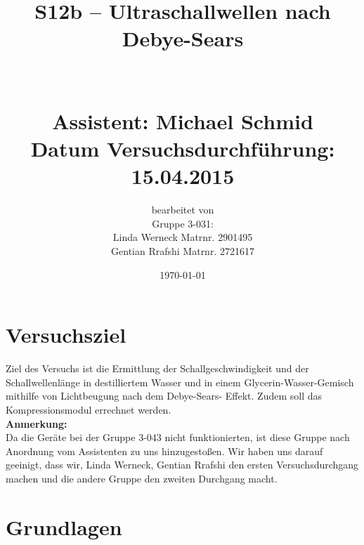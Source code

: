 \documentclass[fontsize=12pt]{scrartcl}
\begin{document}
\begin{minipage}{\textwidth}
\begin{center}\large
\title{S12b – Ultraschallwellen nach Debye-Sears \\
		~\\
		~\\
		Assistent: Michael Schmid \\
		Datum Versuchsdurchführung: \\
		15.04.2015}

\author{bearbeitet von\\
		Gruppe 3-031: \\
		Linda Werneck Matrnr. 2901495 \\
		Gentian Rrafshi Matrnr. 2721617 }
\date{\today}

\maketitle

\end{center}
\end{minipage}

\newpage

\tableofcontents

\newpage
\noindent

\section{ Versuchsziel}

Ziel des Versuchs ist die Ermittlung der Schallgeschwindigkeit und der Schallwellenlänge in destilliertem Wasser und in einem Glycerin-Wasser-Gemisch mithilfe von Lichtbeugung nach dem Debye-Sears- Effekt. Zudem soll das Kompressionsmodul errechnet werden.\\
\textbf{Anmerkung:}\\
Da die Geräte bei der Gruppe 3-043 nicht funktionierten, ist diese Gruppe nach Anordnung vom Assistenten zu uns hinzugestoßen. Wir haben uns darauf geeinigt, dass wir, Linda Werneck, Gentian Rrafshi den ersten Versuchsdurchgang machen und die andere Gruppe den zweiten Durchgang macht.

\section{ Grundlagen}
\end{document}
